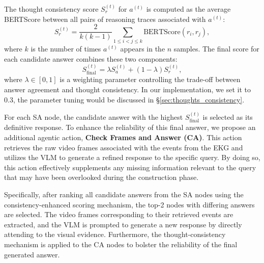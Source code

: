 The thought consistency score $S_r^{(t)}$ for $a^{(t)}$ is computed as the average BERTScore between all pairs of reasoning traces associated with $a^{(t)}$:
\begin{equation}
S_r^{(t)} = \frac{2}{k(k-1)} \sum\limits_{1 \leq i < j \leq k} \text{BERTScore}(r_i, r_j),
\end{equation}
where $k$ is the number of times $a^{(t)}$ appears in the $n$ samples. The final score for each candidate answer combines these two components:
\begin{equation}
\label{eq:thoughts_consistency_weight}
S_{\text{final}}^{(t)} = \lambda S_a^{(t)} + (1 - \lambda) S_r^{(t)},
\end{equation}
where $\lambda \in [0, 1]$ is a weighting parameter controlling the trade-off between answer agreement and thought consistency. In our implementation, we set it to 0.3, the parameter tuning would be discussed in \S\ref{sec:thoughts_consistency}.



For each {SA} node, the candidate answer with the highest $S_{\text{final}}^{(t)}$ is selected as its definitive response. To enhance the reliability of this final answer, we propose an additional agentic action, \textbf{Check Frames and Answer (CA)}. This action retrieves the raw video frames associated with the events from the EKG and utilizes the VLM to generate a refined response to the specific query. By doing so, this action effectively supplements any missing information relevant to the query that may have been overlooked during the construction phase.


Specifically, after ranking all candidate answers from the {SA} nodes using the consistency-enhanced scoring mechanism, the top-2 nodes with differing answers are selected. The video frames corresponding to their retrieved events are extracted, and the VLM is prompted to generate a new response by directly attending to the visual evidence. Furthermore, the thought-consistency mechanism is applied to the {CA} nodes to bolster the reliability of the final generated answer.


